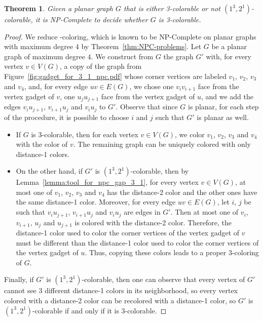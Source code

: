\documentclass{article}
\newtheorem{theorem}{Theorem}
\newcommand{\colo}[2]{(1^{#1}, 2^{#2})}
\begin{document}
\begin{theorem}\label{thm:npc_gap_3_1}
Given a planar graph $G$ that is either 3-colorable or not $\colo{3}{1}$-colorable,
it is NP-Complete to decide whether $G$ is 3-colorable.
\end{theorem}
\begin{proof}
We reduce {-coloring}, which is known to be NP-Complete on planar graphs with maximum degree 4 by Theorem~\ref{thm:NPC-problems}. Let $G$ be a planar graph of maximum degree $4$. We construct from $G$ the graph $G'$ with, for every vertex $v \in V(G)$, a copy of the graph from Figure~\ref{fig:gadget_for_3_1_npc.pdf} whose corner vertices are labeled $v_1$, $v_2$, $v_3$ and $v_4$, and, for every edge $uv \in E(G)$, we chose one $v_iv_{i + 1}$ face from the vertex gadget of $v$, one $u_ju_{j + 1}$ face from the vertex gadget of $u$, and we add the edges $v_iu_{j + 1}$, $v_{i + 1}u_j$ and $v_iu_j$ to $G'$. Observe that since $G$ is planar, for each step of the procedure, it is possible to choose $i$ and $j$ such that $G'$ is planar as well.
\begin{itemize}
    \item If $G$ is $3$-colorable, then for each vertex $v \in V(G)$, we color $v_1$, $v_2$, $v_3$ and $v_4$ with the color of $v$. The remaining graph can be uniquely colored with only distance-1 colors. 
    \item On the other hand, if $G'$ is $\colo{3}{1}$-colorable, then by Lemma~\ref{lemma:tool_for_npc_gap_3_1}, for every vertex $v \in V(G)$, at most one of $v_1$, $v_2$, $v_3$ and $v_4$ has the distance-2 color and the other ones have the same distance-1 color. Moreover, for every edge $uv \in E(G)$, let $i$, $j$ be such that $v_iu_{j + 1}$, $v_{i + 1}u_j$ and $v_iu_j$ are edges in $G'$. Then at most one of $v_i$, $v_{i + 1}$, $u_j$ and $u_{j + 1}$ is colored with the distance-2 color. Therefore, the distance-1 color used to color the corner vertices of the vertex gadget of $v$ must be different than the distance-1 color used to color the corner vertices of the vertex gadget of $u$. Thus, copying these colors leads to a proper $3$-coloring of $G$. 
\end{itemize}
Finally, if $G'$ is $\colo{3}{1}$-colorable, then one can observe that every vertex of $G'$ cannot see $3$ different distance-1 colors in its neighborhood, so every vertex colored with a distance-2 color can be recolored with a distance-1 color, so $G'$ is $\colo{3}{1}$-colorable if and only if it is $3$-colorable.
\end{proof}
\end{document}
